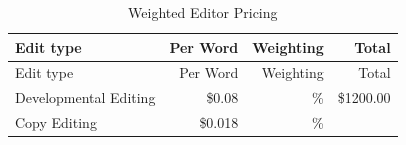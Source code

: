 \documentclass[11pt,openany]{book}
\begin{document}
\begin{longtable}[]{@{}lrrr@{}}
\caption{Weighted Editor Pricing}\tabularnewline
\toprule
\begin{minipage}[b]{0.34\columnwidth}\raggedright
Edit type\strut
\end{minipage} & \begin{minipage}[b]{0.16\columnwidth}\raggedleft
Per Word\strut
\end{minipage} & \begin{minipage}[b]{0.16\columnwidth}\raggedleft
Weighting\strut
\end{minipage} & \begin{minipage}[b]{0.22\columnwidth}\raggedleft
Total\strut
\end{minipage}\tabularnewline
\midrule
\endfirsthead
\toprule
\begin{minipage}[b]{0.34\columnwidth}\raggedright
Edit type\strut
\end{minipage} & \begin{minipage}[b]{0.16\columnwidth}\raggedleft
Per Word\strut
\end{minipage} & \begin{minipage}[b]{0.16\columnwidth}\raggedleft
Weighting\strut
\end{minipage} & \begin{minipage}[b]{0.22\columnwidth}\raggedleft
Total\strut
\end{minipage}\tabularnewline
\midrule
\endhead
\begin{minipage}[t]{0.34\columnwidth}\raggedright
Developmental Editing\strut
\end{minipage} & \begin{minipage}[t]{0.16\columnwidth}\raggedleft
\$0.08\strut
\end{minipage} & \begin{minipage}[t]{0.16\columnwidth}\raggedleft
30\%\strut
\end{minipage} & \begin{minipage}[t]{0.22\columnwidth}\raggedleft
\$1200.00\strut
\end{minipage}\tabularnewline
\begin{minipage}[t]{0.34\columnwidth}\raggedright
Copy Editing\strut
\end{minipage} & \begin{minipage}[t]{0.16\columnwidth}\raggedleft
\$0.018\strut
\end{minipage} & \begin{minipage}[t]{0.16\columnwidth}\raggedleft
50\%\strut
\end{minipage} & \begin{minipage}[t]{0.22\columnwidth}\raggedleft

\end{minipage}
\end{longtable}
\end{document}
